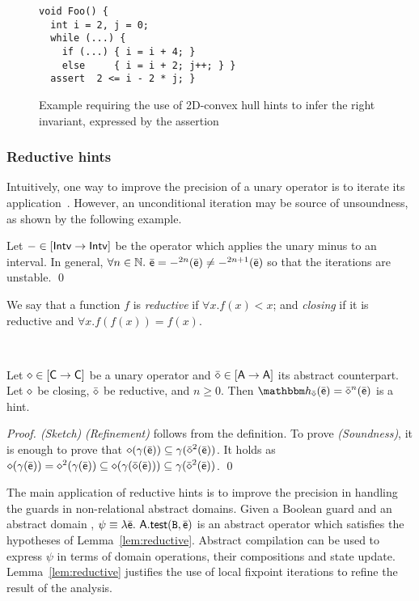 \documentclass[sttt]{svjour}
\begin{document}
\begin{figure}%
\centering
\begin{verbatim}
void Foo() {
  int i = 2, j = 0;
  while (...) {
    if (...) { i = i + 4; }
    else     { i = i + 2; j++; } }
  assert  2 <= i - 2 * j; }
\end{verbatim}
\vspace{-2pt}
\caption{Example requiring the use of 2D-convex hull hints to infer the right invariant, expressed by the assertion}
\label{fig:2dhints}
\vspace{-3pt}
\end{figure}


\subsubsection{Reductive hints}
Intuitively, one way to improve the precision of a unary operator is to iterate its application~\cite{Granger92}.
However, an unconditional iteration may be source of unsoundness, as shown by the following example.
\begin{example}
Let $- \in [\mathsf{Intv} \rightarrow\mathsf{Intv}]$ be the operator which
applies the unary minus to an interval.
In general, $\forall n \in \mathbb{N}.\ \bar{\mathsf{\mathsf{e}}} = -^{2n}(\bar{\mathsf{\mathsf{e}}}) \neq
-^{2n+1}(\bar{\mathsf{\mathsf{e}}})$ so that the iterations are unstable. \qed
\end{example}
We say that a function $f$ is \emph{reductive} if $\forall x. f(x) \less x$; and  \emph{closing} if it is reductive and $\forall x. f(f(x)) = f(x)$.

\
\begin{lemma}
\label{lem:reductive}
Let $\diamond \in [\mathsf{C} \rightarrow\mathsf{C}]$ be a unary operator and $\bar{\mathsf{\mathsf{\diamond}}} \in [{\mathsf{A}} \rightarrow{\mathsf{A}}]$ its abstract counterpart.
Let $\diamond$ be closing,  $\bar{\mathsf{\mathsf{\diamond}}}$ be reductive, and $n \geq 0$.
Then $\hint{\ael{\op}}(\ael{e}) =\ael{\op}^{n}(\ael{e})$ is a hint.
\end{lemma}
\textit{Proof. (Sketch)}
\textit{(Refinement)} follows from the definition.
To prove \textit{(Soundness)}, it is enough to  prove that  $\diamond(\gamma(\bar{\mathsf{\mathsf{e}}})) \subseteq \gamma(\bar{\mathsf{\mathsf{\diamond}}}^2(\bar{\mathsf{\mathsf{e}}}))$.
It holds as $\diamond(\gamma(\bar{\mathsf{\mathsf{e}}})) = \diamond^2(\gamma(\bar{\mathsf{\mathsf{e}}})) \subseteq  \diamond(\gamma(\bar{\mathsf{\mathsf{\diamond}}}(\bar{\mathsf{\mathsf{e}}}))) \subseteq \gamma(\bar{\mathsf{\mathsf{\diamond}}}^2(\bar{\mathsf{\mathsf{e}}}))$.
\qed

The main application of reductive hints is to improve the precision in handling the guards in non-relational abstract domains.
Given a Boolean guard \code{B} and an abstract domain \adom{A}, $\psi \equiv \lambda{\ensuremath{\bar{\mathsf{\mathsf{e}}}}}.\ {\mathsf{A}}.\mathsf{\mathsf{test}}(\mathtt{B}, \bar{\mathsf{\mathsf{e}}})$ is an abstract operator which satisfies the hypotheses of Lemma~\ref{lem:reductive}.
Abstract compilation can be used to express $\psi$ in terms of domain operations, their compositions and state update.
Lemma~\ref{lem:reductive} justifies the use of local fixpoint iterations to refine the result of the analysis.
\end{document}
